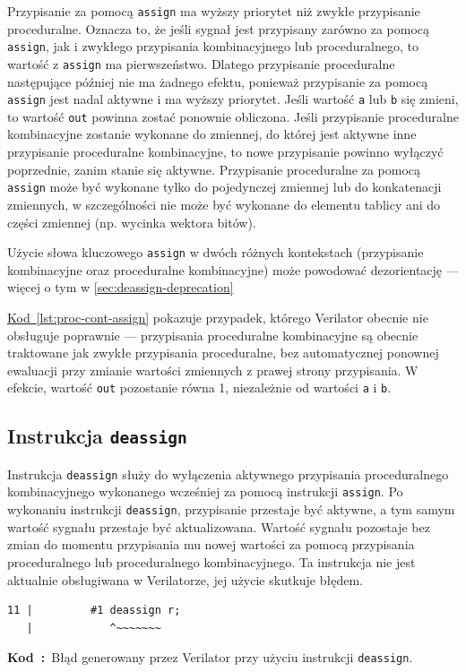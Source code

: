 \documentclass[shortabstract, inz]{iithesis}
\newcounter{kod}[chapter]
\renewcommand{\thekod}{\thechapter\arabic{kod}}
\newcommand{\codecaption}[2]{%
  \par\refstepcounter{kod}\label{#1}%
  \noindent\textbf{Kod~\thekod:}~#2\par
  \vspace*{1.0\baselineskip}%
}
\newcommand{\coderef}[1]{\hyperref[#1]{Kod~\ref*{#1}}}
\begin{document}
Przypisanie za pomocą \texttt{assign} ma wyższy priorytet niż zwykłe przypisanie proceduralne. Oznacza to, że jeśli sygnał jest przypisany zarówno za pomocą \texttt{assign}, jak i zwykłego przypisania kombinacyjnego lub proceduralnego, to wartość z \texttt{assign} ma pierwszeństwo.
Dlatego przypisanie proceduralne następujące później nie ma żadnego efektu, ponieważ przypisanie za pomocą \texttt{assign} jest nadal aktywne i ma wyższy priorytet.
Jeśli wartość \texttt{a} lub \texttt{b} się zmieni, to wartość \texttt{out} powinna zostać ponownie obliczona.
Jeśli przypisanie proceduralne kombinacyjne zostanie wykonane do zmiennej, do której jest aktywne inne przypisanie proceduralne kombinacyjne, to nowe przypisanie powinno wyłączyć poprzednie, zanim stanie się aktywne.
Przypisanie proceduralne za pomocą \texttt{assign} może być wykonane tylko do pojedynczej zmiennej lub do konkatenacji zmiennych, w szczególności nie może być wykonane do elementu tablicy ani do części zmiennej (np. wycinka wektora bitów).

Użycie słowa kluczowego \texttt{assign} w dwóch różnych kontekstach (przypisanie kombinacyjne oraz proceduralne kombinacyjne) może powodować dezorientację --- więcej o tym w \ref{sec:deassign-deprecation}

\coderef{lst:proc-cont-assign} pokazuje przypadek, którego Verilator obecnie nie obsługuje poprawnie --- przypisania proceduralne kombinacyjne są obecnie traktowane jak zwykłe przypisania proceduralne, bez automatycznej ponownej ewaluacji przy zmianie wartości zmiennych z prawej strony przypisania. W efekcie, wartość \texttt{out} pozostanie równa 1, niezależnie od wartości \texttt{a} i \texttt{b}.

\subsection{Instrukcja \texttt{deassign}}
Instrukcja \texttt{deassign} służy do wyłączenia aktywnego przypisania proceduralnego kombinacyjnego wykonanego wcześniej za pomocą instrukcji \texttt{assign}. Po wykonaniu instrukcji \texttt{deassign}, przypisanie przestaje być aktywne, a tym samym wartość sygnału przestaje być aktualizowana. Wartość sygnału pozostaje bez zmian do momentu przypisania mu nowej wartości za pomocą przypisania proceduralnego lub proceduralnego kombinacyjnego.
Ta instrukcja nie jest aktualnie obsługiwana w Verilatorze, jej użycie skutkuje błędem.
\begin{Verbatim}[fontsize=\footnotesize]
%Error-UNSUPPORTED: test.v:11:12: Unsupported: Verilog 1995 deassign
11 |         #1 deassign r;
   |            ^~~~~~~~
\end{Verbatim}
\codecaption{lst:deassign-error}{Błąd generowany przez Verilator przy użyciu instrukcji \texttt{deassign}.}
\end{document}
